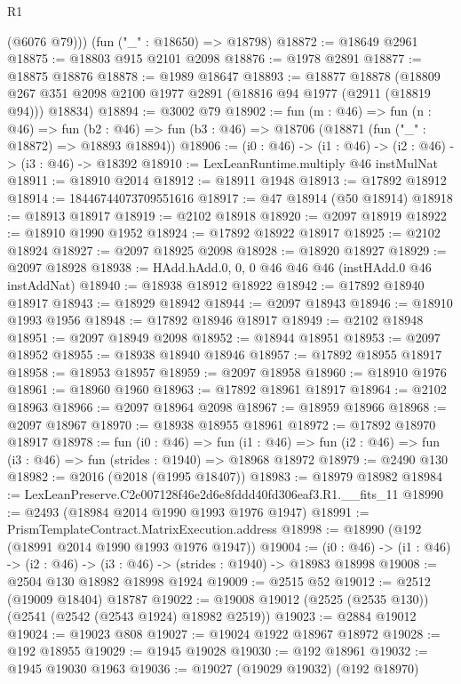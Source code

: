 \begin{lexlean}{R1}
\begin{coremodule}
        (@6076 @79)))
    (fun ("_" : @18650) => @18798)
@18872 := @18649 @2961
@18875 := @18803 @915 @2101 @2098
@18876 := @1978 @2891
@18877 := @18875 @18876
@18878 := @1989 @18647
@18893 := @18877
    @18878
    (@18809 @267 @351 @2098 @2100 @1977 @2891 (@18816 @94 @1977 (@2911 (@18819 @94))) @18834)
@18894 := @3002 @79
@18902 := fun (m : @46) =>
  fun (n : @46) =>
  fun (b2 : @46) => fun (b3 : @46) => @18706 (@18871 (fun ("_" : @18872) => @18893 @18894))
@18906 := (i0 : @46) -> (i1 : @46) -> (i2 : @46) -> (i3 : @46) -> @18392
@18910 := LexLeanRuntime.multiply @46 instMulNat
@18911 := @18910 @2014
@18912 := @18911 @1948
@18913 := @17892 @18912
@18914 := 18446744073709551616
@18917 := @47 @18914 (@50 @18914)
@18918 := @18913 @18917
@18919 := @2102 @18918
@18920 := @2097 @18919
@18922 := @18910 @1990 @1952
@18924 := @17892 @18922 @18917
@18925 := @2102 @18924
@18927 := @2097 @18925 @2098
@18928 := @18920 @18927
@18929 := @2097 @18928
@18938 := HAdd.hAdd.{0, 0, 0} @46 @46 @46 (instHAdd.{0} @46 instAddNat)
@18940 := @18938 @18912 @18922
@18942 := @17892 @18940 @18917
@18943 := @18929 @18942
@18944 := @2097 @18943
@18946 := @18910 @1993 @1956
@18948 := @17892 @18946 @18917
@18949 := @2102 @18948
@18951 := @2097 @18949 @2098
@18952 := @18944 @18951
@18953 := @2097 @18952
@18955 := @18938 @18940 @18946
@18957 := @17892 @18955 @18917
@18958 := @18953 @18957
@18959 := @2097 @18958
@18960 := @18910 @1976
@18961 := @18960 @1960
@18963 := @17892 @18961 @18917
@18964 := @2102 @18963
@18966 := @2097 @18964 @2098
@18967 := @18959 @18966
@18968 := @2097 @18967
@18970 := @18938 @18955 @18961
@18972 := @17892 @18970 @18917
@18978 := fun (i0 : @46) =>
  fun (i1 : @46) => fun (i2 : @46) => fun (i3 : @46) => fun (strides : @1940) => @18968 @18972
@18979 := @2490 @130
@18982 := @2016 (@2018 (@1995 @18407))
@18983 := @18979 @18982
@18984 := LexLeanPreserve.C2e007128f46e2d6e8fddd40fd306eaf3.R1.__fits_11
@18990 := @2493 (@18984 @2014 @1990 @1993 @1976 @1947)
@18991 := PrismTemplateContract.MatrixExecution.address
@18998 := @18990 (@192 (@18991 @2014 @1990 @1993 @1976 @1947))
@19004 := (i0 : @46) -> (i1 : @46) -> (i2 : @46) -> (i3 : @46) -> (strides : @1940) -> @18983 @18998
@19008 := @2504 @130 @18982 @18998 @1924
@19009 := @2515 @52
@19012 := @2512 (@19009 @18404) @18787
@19022 := @19008 @19012 (@2525 (@2535 @130)) (@2541 (@2542 (@2543 @1924) @18982 @2519))
@19023 := @2884 @19012
@19024 := @19023 @808
@19027 := @19024 @1922 @18967 @18972
@19028 := @192 @18955
@19029 := @1945 @19028
@19030 := @192 @18961
@19032 := @1945 @19030 @1963
@19036 := @19027 (@19029 @19032) (@192 @18970)

\end{coremodule}
\end{lexlean}
